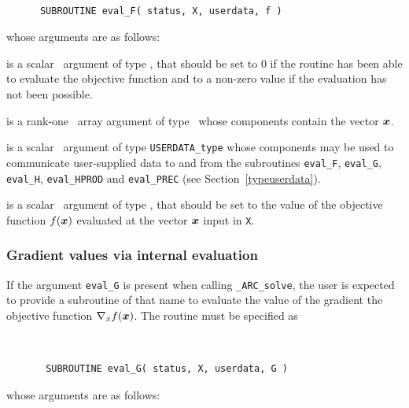 \documentclass{galahad}
\newcommand{\packagename}{ARC}
\newcommand{\fullpackagename}{\libraryname\_\packagename}
\newcommand{\solver}{{\tt \fullpackagename\_solve}}
\begin{document}
\def\baselinestretch{0.8}
{\tt
\begin{verbatim}
      SUBROUTINE eval_F( status, X, userdata, f )
\end{verbatim}
}
\def\baselinestretch{1.0}
\noindent whose arguments are as follows:

\begin{description}
 is a scalar \intentout\ argument of type \integer,
that should be set to 0 if the routine has been able to evaluate
the objective function
and to a non-zero value if the evaluation has not been possible.

 is a rank-one \intentin\ array argument of type \realdp\
whose components contain the vector ${\bm{x}}$.

 is a scalar \intentinout\ argument of type
{\tt USERDATA\_type} whose components may be used
to communicate user-supplied data to and from the
subroutines {\tt eval\_F}, {\tt eval\_G},
{\tt eval\_H}, {\tt eval\_HPROD} and {\tt eval\_PREC}
(see Section~\ref{typeuserdata}).

 is a scalar \intentout\ argument of type \realdp,
that should be set to the value of the objective function $f({\bm{x}})$
evaluated at the vector ${\bm{x}}$ input in {\tt X}.

\end{description}


\subsubsection{Gradient values via internal evaluation\label{gfv}}

If the argument {\tt eval\_G} is present when calling \solver, the
user is expected to provide a subroutine of that name to evaluate the
value of the gradient the objective function $\nabla_x f({\bm{x}})$.
The routine must be specified as

\def\baselinestretch{0.8}
{\tt
\begin{verbatim}
       SUBROUTINE eval_G( status, X, userdata, G )
\end{verbatim} }
\def\baselinestretch{1.0}
\noindent whose arguments are as follows:
\end{document}
